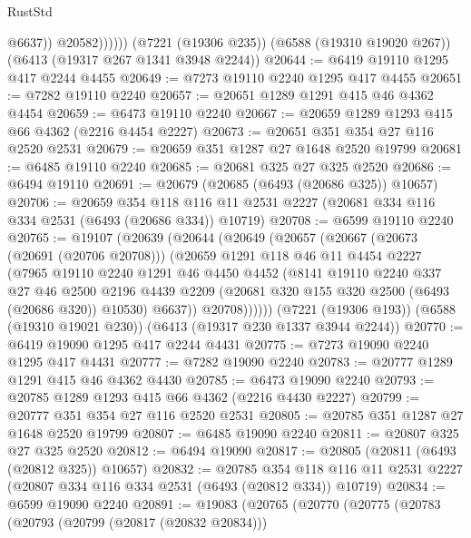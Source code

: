 \begin{lexlean}{RustStd}
\begin{coremodule}
                    @6637))
                @20582))))))
    (@7221 (@19306 @235))
    (@6588 (@19310 @19020 @267))
    (@6413 (@19317 @267 @1341 @3948 @2244))
@20644 := @6419 @19110 @1295 @417 @2244 @4455
@20649 := @7273 @19110 @2240 @1295 @417 @4455
@20651 := @7282 @19110 @2240
@20657 := @20651 @1289 @1291 @415 @46 @4362 @4454
@20659 := @6473 @19110 @2240
@20667 := @20659 @1289 @1293 @415 @66 @4362 (@2216 @4454 @2227)
@20673 := @20651 @351 @354 @27 @116 @2520 @2531
@20679 := @20659 @351 @1287 @27 @1648 @2520 @19799
@20681 := @6485 @19110 @2240
@20685 := @20681 @325 @27 @325 @2520
@20686 := @6494 @19110
@20691 := @20679 (@20685 (@6493 (@20686 @325)) @10657)
@20706 := @20659
    @354
    @118
    @116
    @11
    @2531
    @2227
    (@20681 @334 @116 @334 @2531 (@6493 (@20686 @334)) @10719)
@20708 := @6599 @19110 @2240
@20765 := @19107
    (@20639
      (@20644
        (@20649
          (@20657
            (@20667
              (@20673 (@20691 (@20706 @20708)))
              (@20659
                @1291
                @118
                @46
                @11
                @4454
                @2227
                (@7965
                  @19110
                  @2240
                  @1291
                  @46
                  @4450
                  @4452
                  (@8141
                    @19110
                    @2240
                    @337
                    @27
                    @46
                    @2500
                    @2196
                    @4439
                    @2209
                    (@20681 @320 @155 @320 @2500 (@6493 (@20686 @320)) @10530)
                    @6637))
                @20708))))))
    (@7221 (@19306 @193))
    (@6588 (@19310 @19021 @230))
    (@6413 (@19317 @230 @1337 @3944 @2244))
@20770 := @6419 @19090 @1295 @417 @2244 @4431
@20775 := @7273 @19090 @2240 @1295 @417 @4431
@20777 := @7282 @19090 @2240
@20783 := @20777 @1289 @1291 @415 @46 @4362 @4430
@20785 := @6473 @19090 @2240
@20793 := @20785 @1289 @1293 @415 @66 @4362 (@2216 @4430 @2227)
@20799 := @20777 @351 @354 @27 @116 @2520 @2531
@20805 := @20785 @351 @1287 @27 @1648 @2520 @19799
@20807 := @6485 @19090 @2240
@20811 := @20807 @325 @27 @325 @2520
@20812 := @6494 @19090
@20817 := @20805 (@20811 (@6493 (@20812 @325)) @10657)
@20832 := @20785
    @354
    @118
    @116
    @11
    @2531
    @2227
    (@20807 @334 @116 @334 @2531 (@6493 (@20812 @334)) @10719)
@20834 := @6599 @19090 @2240
@20891 := @19083
    (@20765
      (@20770
        (@20775
          (@20783
            (@20793
              (@20799 (@20817 (@20832 @20834)))

\end{coremodule}
\end{lexlean}
